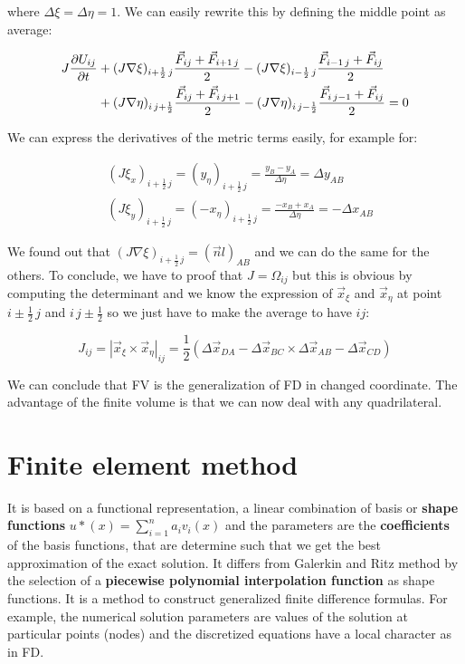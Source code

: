 where $\Delta \xi = \Delta \eta = 1$. We can easily rewrite this by defining the middle point as average: 

\begin{equation}
\begin{aligned}
J\frac{\partial U_{ij}}{\partial t} &+ (J \nabla \xi)_{i+\frac{1}{2}\, j} \frac{\vec{F}_{ij}+ \vec{F}_{i+1\, j}}{2} - (J \nabla \xi)_{i-\frac{1}{2}\, j} \frac{\vec{F}_{i-1 \, j}+ \vec{F}_{ij}}{2} \\
&+ (J \nabla \eta)_{i \, j + \frac{1}{2}} \frac{\vec{F}_{ij}+ \vec{F}_{i\, j + 1}}{2}
- (J \nabla \eta)_{i \, j -\frac{1}{2}} \frac{\vec{F}_{i\, j-1}+ \vec{F}_{ij}}{2} = 0
\end{aligned}
\end{equation}

We can express the derivatives of the metric terms easily, for example for: 

\begin{equation}
\begin{aligned}
&(J\xi _x)_{i+\frac{1}{2}\, j} = (y_\eta) _{i+\frac{1}{2}\, j} = \frac{y_B - y_A}{\Delta \eta} = \Delta y_{AB}\\
&(J\xi _y)_{i+\frac{1}{2}\, j} = (-x_\eta) _{i+\frac{1}{2}\, j} = \frac{-x_B + x_A}{\Delta \eta} = -\Delta x_{AB}
\end{aligned}
\end{equation}

We found out that $(J\nabla \xi)_{i+\frac{1}{2}\, j} = (\vec{n} l)_{AB}$ and we can do the same for the others. To conclude, we have to proof that $J = \Omega _{ij}$ but this is obvious by computing the determinant and we know the expression of $\vec{x}_\xi$ and $\vec{x}_\eta$ at point $i\pm \frac{1}{2} \, j$ and $i\, j \pm\frac{1}{2}$ so we just have to make the average to have $ij$: 

\begin{equation}
J_{ij} = |\vec{x}_\xi \times \vec{x}_\eta |_{ij} = \frac{1}{2}(\Delta \vec{x}_{DA}-\Delta \vec{x}_{BC}\times \Delta \vec{x}_{AB}- \Delta \vec{x}_{CD})
\end{equation}

We can conclude that FV is the generalization of FD in changed coordinate. The advantage of the finite volume is that we can now deal with any quadrilateral. 

\section{Finite element method}
It is based on a functional representation, a linear combination of basis or \textbf{shape functions} $u*(x) = \sum _{i=1}^n a_iv_i(x)$ and the parameters are the \textbf{coefficients} of the basis functions, that are determine such that we get the best approximation of the exact solution. It differs from Galerkin and Ritz method by the selection of a \textbf{piecewise polynomial interpolation function} as shape functions. It is a method to construct generalized finite difference formulas. For example, the numerical solution parameters are values of the solution at particular points (nodes) and the discretized equations have a local character as in FD. \\

